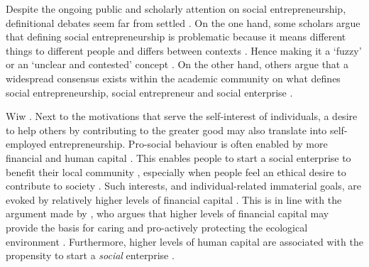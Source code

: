 \documentclass{article}
\begin{document}
  Despite the ongoing public and scholarly attention on social entrepreneurship, definitional debates seem far from settled \parencite{Saebi2019}. On the one hand, some scholars argue that defining social entrepreneurship is problematic because it means different things to different people and differs between contexts \parencite{Mair2010}. Hence making it a ‘fuzzy' \parencite{Choi2014} or an ‘unclear and contested' concept \textcite{Saebi2019}. On the other hand, others argue that a widespread consensus exists within the academic community on what defines social entrepreneurship, social entrepreneur and social enterprise \parencite{Alegre2017}. 

Wiw \parencite{Stephan2015}. Next to the motivations that serve the self-interest of individuals, a desire to help others by contributing to the greater good may also translate into self-employed entrepreneurship. Pro-social behaviour is often enabled by more financial and human capital \parencite{Korndörfer2015}. This enables people to start a social enterprise to benefit their local community \parencite{Stephan2015}, especially when people feel an ethical desire to contribute to society \textcite{Mair2006, Stirzaker2021}. Such interests, and individual-related immaterial goals, are evoked by relatively higher levels of financial capital \parencite{Inglehart1977, Kraus2012}. This is in line with the argument made by \textcite{Inglehart1977}, who argues that higher levels of financial capital may provide the basis for caring and pro-actively protecting the ecological environment \textcite{Franzen2013}. Furthermore, higher levels of human capital are associated with the propensity to start a \emph{social }enterprise \parencite{Pathak2016, Stephan2015}. 
\end{document}
